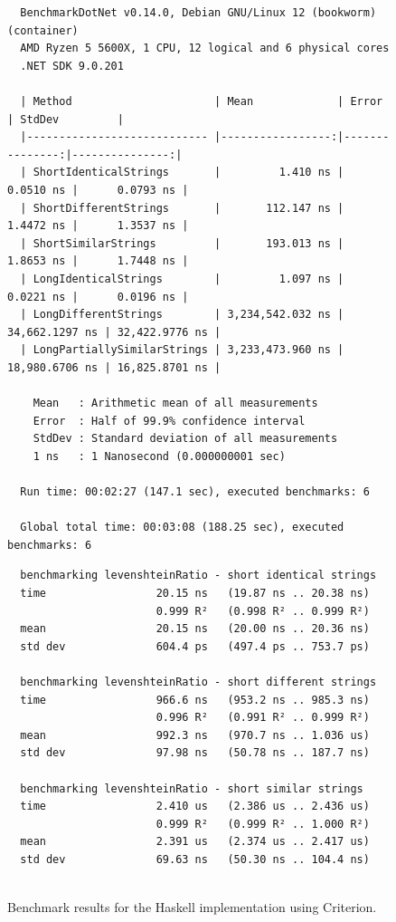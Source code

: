 \begin{landscape}
\begin{figure}[H]
\begin{verbatim}
  BenchmarkDotNet v0.14.0, Debian GNU/Linux 12 (bookworm) (container)
  AMD Ryzen 5 5600X, 1 CPU, 12 logical and 6 physical cores
  .NET SDK 9.0.201

  | Method                      | Mean             | Error          | StdDev         |
  |---------------------------- |-----------------:|---------------:|---------------:|
  | ShortIdenticalStrings       |         1.410 ns |      0.0510 ns |      0.0793 ns |
  | ShortDifferentStrings       |       112.147 ns |      1.4472 ns |      1.3537 ns |
  | ShortSimilarStrings         |       193.013 ns |      1.8653 ns |      1.7448 ns |
  | LongIdenticalStrings        |         1.097 ns |      0.0221 ns |      0.0196 ns |
  | LongDifferentStrings        | 3,234,542.032 ns | 34,662.1297 ns | 32,422.9776 ns |
  | LongPartiallySimilarStrings | 3,233,473.960 ns | 18,980.6706 ns | 16,825.8701 ns |

    Mean   : Arithmetic mean of all measurements
    Error  : Half of 99.9% confidence interval
    StdDev : Standard deviation of all measurements
    1 ns   : 1 Nanosecond (0.000000001 sec)

  Run time: 00:02:27 (147.1 sec), executed benchmarks: 6

  Global total time: 00:03:08 (188.25 sec), executed benchmarks: 6
  \end{verbatim}
\end{figure}
\hfill

\begin{figure}[H]
  \caption{Benchmark results for the Haskell implementation using Criterion.}
  \label{code:benchmark-haskell}
  \begin{verbatim}
  benchmarking levenshteinRatio - short identical strings
  time                 20.15 ns   (19.87 ns .. 20.38 ns)
                       0.999 R²   (0.998 R² .. 0.999 R²)
  mean                 20.15 ns   (20.00 ns .. 20.36 ns)
  std dev              604.4 ps   (497.4 ps .. 753.7 ps)

  benchmarking levenshteinRatio - short different strings
  time                 966.6 ns   (953.2 ns .. 985.3 ns)
                       0.996 R²   (0.991 R² .. 0.999 R²)
  mean                 992.3 ns   (970.7 ns .. 1.036 us)
  std dev              97.98 ns   (50.78 ns .. 187.7 ns)

  benchmarking levenshteinRatio - short similar strings
  time                 2.410 us   (2.386 us .. 2.436 us)
                       0.999 R²   (0.999 R² .. 1.000 R²)
  mean                 2.391 us   (2.374 us .. 2.417 us)
  std dev              69.63 ns   (50.30 ns .. 104.4 ns)


\end{verbatim}
\end{figure}
\end{landscape}
